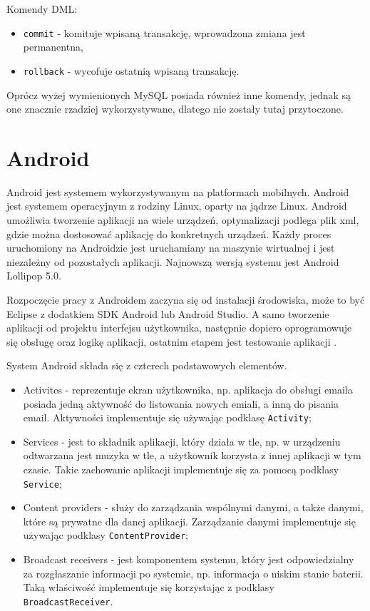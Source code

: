 \documentclass[eng,printmode,oneside]{mgr}
\begin{document}
Komendy DML:
\begin{itemize}
  \item \texttt{commit} - komituje wpisaną transakcję, wprowadzona zmiana jest
  permanentna,
  \item \texttt{rollback} - wycofuje ostatnią wpisaną transakcję.
\end{itemize}

Oprócz wyżej wymienionych MySQL posiada również inne komendy, jednak są one
znacznie rzadziej wykorzystywane, dlatego nie zostały tutaj przytoczone.

\newpage
\section{Android}

Android jest systemem wykorzystywanym na platformach mobilnych. Android
jest systemem operacyjnym z rodziny Linux, oparty na jądrze Linux. Android
umożliwia tworzenie aplikacji na wiele urządzeń, optymalizacji podlega plik xml,
gdzie można dostosować aplikację do konkretnych urządzeń. Każdy proces
uruchomiony na Androidzie jest uruchamiany na maszynie wirtualnej i jest
niezależny od pozostałych aplikacji. Najnowszą wersją systemu jest Android
Lollipop 5.0.

Rozpoczęcie pracy z Androidem zaczyna się od instalacji środowiska, może to być
Eclipse z dodatkiem SDK Android lub Android Studio. A samo tworzenie aplikacji
od projektu interfejsu użytkownika, następnie dopiero oprogramowuje się
obsługę oraz logikę aplikacji, ostatnim etapem jest testowanie aplikacji
\cite{developer.android}.

System Android składa się z czterech podstawowych elementów. 

\begin{itemize}
  \item Activites - reprezentuje ekran użytkownika, np. aplikacja do obsługi
  emaila posiada jedną aktywność do listowania nowych emiali, a inną
  do pisania email. Aktywności implementuje się używając
  podklasę \texttt{Activity};
  \item Services - jest to składnik aplikacji, który działa w tle, np. w
  urządzeniu odtwarzana jest muzyka w tle, a użytkownik korzysta z innej
  aplikacji w tym czasie. Takie zachowanie aplikacji implementuje się za pomocą
  podklasy \texttt{Service};
  \item Content providers - służy do zarządzania wspólnymi danymi, a także
  danymi, które są prywatne dla danej aplikacji. Zarządzanie danymi
  implementuje się używając podklasy \texttt{ContentProvider};
  \item Broadcast receivers - jest komponentem systemu, który jest
  odpowiedzialny za rozgłaszanie informacji po systemie, np. informacja o
  niskim stanie baterii. Taką właściwość implementuje się korzystając z podklasy
  \texttt{BroadcastReceiver}.
\end{itemize}
\end{document}
